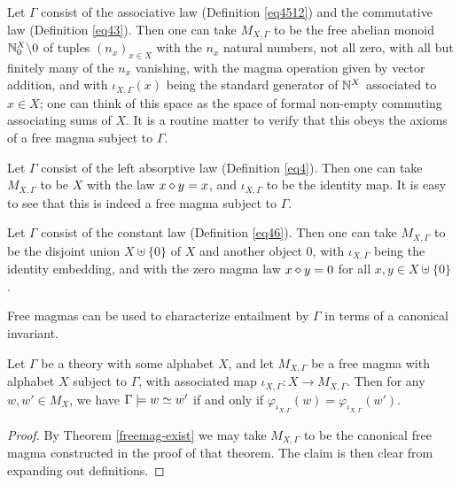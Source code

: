 \begin{example}\label{facm}  Let $\Gamma$ consist of the associative law (Definition \ref{eq4512}) and the commutative law (Definition \ref{eq43}). Then one can take $M_{X,\Gamma}$ to be the free abelian monoid $\mathbb{N}_0^X \backslash 0$ of tuples $(n_x)_{x \in X}$ with the $n_x$ natural numbers, not all zero, with all but finitely many of the $n_x$ vanishing, with the magma operation given by vector addition, and with $\iota_{X,\Gamma}(x)$ being the standard generator of $\mathbb{N}^X$ associated to $x \in X$; one can think of this space as the space of formal non-empty commuting associating sums of $X$.  It is a routine matter to verify that this obeys the axioms of a free magma subject to $\Gamma$.
\end{example}

\begin{example}\label{freeleft} Let $\Gamma$ consist of the left absorptive law (Definition \ref{eq4}).  Then one can take $M_{X,\Gamma}$ to be $X$ with the law $x \diamond y = x$, and $\iota_{X,\Gamma}$ to be the identity map.  It is easy to see that this is indeed a free magma subject to $\Gamma$.
\end{example}

\begin{example}\label{freeconst} Let $\Gamma$ consist of the constant law (Definition \ref{eq46}).  Then one can take $M_{X,\Gamma}$ to be the disjoint union $X \uplus \{0\}$ of $X$ and another object $0$, with $\iota_{X,\Gamma}$ being the identity embedding, and with the zero magma law $x \diamond y = 0$ for all $x,y \in X \uplus \{0\}$.
\end{example}

Free magmas can be used to characterize entailment by $\Gamma$ in terms of a canonical invariant.

\begin{theorem}\label{canonical-invariant}  Let $\Gamma$ be a theory with some alphabet $X$, and let $M_{X,\Gamma}$ be a free magma with alphabet $X$ subject to $\Gamma$, with associated map $\iota_{X,\Gamma}: X \to M_{X,\Gamma}$.  Then for any $w,w' \in M_X$, we have
 $\Gamma \models w \simeq w'$ if and only if $\varphi_{\iota_{X,\Gamma}}(w) = \varphi_{\iota_{X,\Gamma}}(w')$.
\end{theorem}

\begin{proof} By Theorem \ref{freemag-exist} we may take $M_{X,\Gamma}$ to be the canonical free magma constructed in the proof of that theorem.  The claim is then clear from expanding out definitions.
\end{proof}

